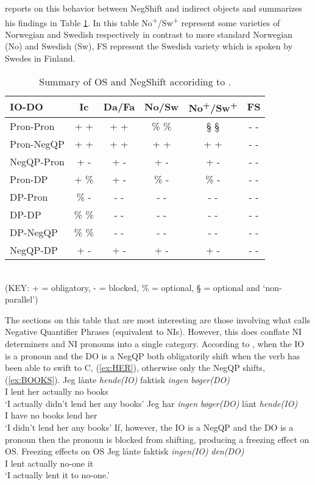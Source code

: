 \documentclass[12pt, letterpaper]{article}
\begin{document}
\citet{christensenInterfacesNegationSyntax2005} reports on this behavior between NegShift and indirect objects and summarizes his findings in Table \ref{tab:OSNEGS}. In this table No\textsuperscript{+}/Sw\textsuperscript{+} represent some varieties of Norwegian and Swedish respectively in contrast to more standard Norwegian (No) and Swedish (Sw), FS represent the Swedish variety which is spoken by Swedes in Finland.
\begin{table}[h!]
\centering
\caption{Summary of OS and NegShift accoriding to \citet{christensenInterfacesNegationSyntax2005}.}
\label{tab:OSNEGS}
\begin{tabular}{lccccc}
\hline
IO-DO & Ic & Da/Fa & No/Sw & No\textsuperscript{+}/Sw\textsuperscript{+} & FS  \\
\hline 
Pron-Pron	&	+ +	&	+ +	&	\% \%	&	§ §	&	- -	\\
Pron-NegQP	&	+ +	&	+ +	&	+ +	&	+ +	&	- -	\\
NegQP-Pron	&	+ -	&	+ -	&	+ -	&	+ -	&	- -	\\
Pron-DP	&	+ \%	&	+ -	&	\% -	&	\% -	&	- -	\\
DP-Pron	&	\% -	&	- -	&	- -	&	- -	&	- -	\\
DP-DP	&	\% \%	&	- -	&	- -	&	- -	&	- -	\\
DP-NegQP	&	\% \%	&	- -	&	- -	&	- -	&	- -	\\
NegQP-DP	&	+ -	&	+ -	&	+ -	&	+ -	&	- -	\\
\hline 
\end{tabular}\\
(KEY: + = obligatory, - = blocked, \% = optional, § = optional and `non-parallel’)
\end{table}

The sections on this table that are most interesting are those involving what \citeauthor{christensenInterfacesNegationSyntax2005} calls Negative Quantifier Phrases (equivalent to NIs). However, this does conflate NI determiners and NI pronouns into a single category. According to \citeauthor{christensenInterfacesNegationSyntax2005}, when the IO is a pronoun and the DO is a NegQP both obligatorily shift when the verb has been able to swift to C, (\ref{ex:HER}), otherwise only the NegQP shifts, (\ref{ex:BOOKS}).
	\ea 
		\ea \label{ex:HER}
		\gll Jeg lånte \textit{hende(IO)} faktisk \textit{ingen} \textit{bøger(DO)}\\
		I lent her actually no books\\
		\glt `I actually didn't lend her any books'
		\ex \label{ex:BOOKS}
		\gll Jeg har \textit{ingen} \textit{bøger(DO)} lånt \textit{hende(IO)}\\
		I have no books lend her\\
		\glt `I didn't lend her any books'
		\z 
	\z 
If, however, the IO is a NegQP and the DO is a pronoun then the pronoun is blocked from shifting, producing a freezing effect on OS.
	\ea Freezing effects on OS
		\ea 
		\gll Jeg lånte faktisk \textit{ingen(IO)} \textit{den(DO)}\\
		I lent actually no-one it\\
		\glt `I actually lent it to no-one.'
		\z 
	\z
\end{document}
